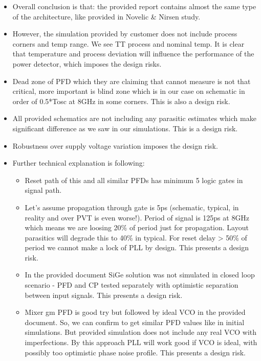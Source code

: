 \documentclass{article}
\begin{document}
\begin{itemize}
	\item Overall conclusion is that: the provided report contains almost the same type of the architecture, like provided in Novelic \& Nirsen study. 
	\item However, the simulation provided by customer does not include process corners and temp range. We see TT process and nominal temp. It is clear that temperature and process deviation will influence the performance of the power detector, which imposes the design risks. %
	\item Dead zone of PFD which they are claiming that cannot measure is not that critical, more important is blind zone which is in our case on schematic in order of 0.5*Tosc at 8GHz in some corners. This is also a design risk. 
	\item All provided schematics are not including any parasitic estimates which make significant difference as we saw in our simulations. This is a design risk. 
	\item Robustness over supply voltage variation imposes the design risk.
	\item Further technical explanation is following:
	\begin{itemize}
		\item Reset path of this and all similar PFDs has minimum 5 logic gates in signal path.
		\item Let's assume propagation through gate is 5ps (schematic, typical, in reality and over PVT is even worse!). Period of signal is 125ps at 8GHz which means we are loosing 20\% of period just for propagation. Layout parasitics will degrade this to 40\% in typical. For reset delay > 50\% of period we cannot make a lock of PLL by design. This presents a design risk.
		\item In the provided document SiGe solution was not simulated in closed loop scenario - PFD and CP tested separately with optimistic separation between input signals. This presents a design risk.
		\item Mixer gm PFD is good try but followed by ideal VCO in the provided document.  So, we can confirm to get similar PFD values like in initial simulations. But provided simulation does not include any real VCO with imperfections.  By this approach PLL will work good if VCO is ideal, with possibly too optimistic phase noise profile. This presents a design risk.

\end{itemize}
\end{itemize}
\end{document}

